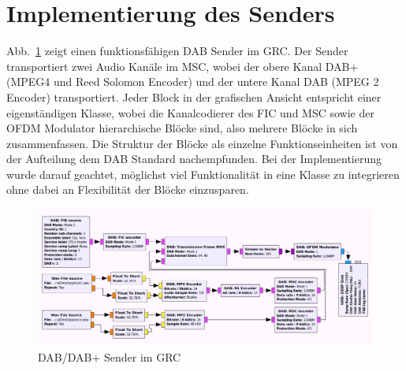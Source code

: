 \section{Implementierung des Senders}

Abb.~\ref{fig:transmitter} zeigt einen funktionsfähigen DAB Sender im GRC. Der Sender transportiert zwei Audio Kanäle im MSC, wobei der obere Kanal DAB+ (MPEG4 und Reed Solomon Encoder) und der untere Kanal DAB (MPEG 2 Encoder) transportiert. Jeder Block in der grafischen Ansicht entspricht einer eigenständigen Klasse, wobei die Kanalcodierer des FIC und MSC sowie der OFDM Modulator hierarchische Blöcke sind, also mehrere Blöcke in sich zusammenfassen. Die Struktur der Blöcke als einzelne Funktionseinheiten ist von der Aufteilung dem DAB Standard nachempfunden. Bei der Implementierung wurde darauf geachtet, möglichst viel Funktionalität in eine Klasse zu integrieren ohne dabei an Flexibilität der Blöcke einzusparen.

\begin{figure}[ht]
\centering
  \includegraphics[width=\textwidth]{figures/GRC_transmitter.png}
	\caption{DAB/DAB+ Sender im GRC}
	\label{fig:transmitter}
\end{figure}

